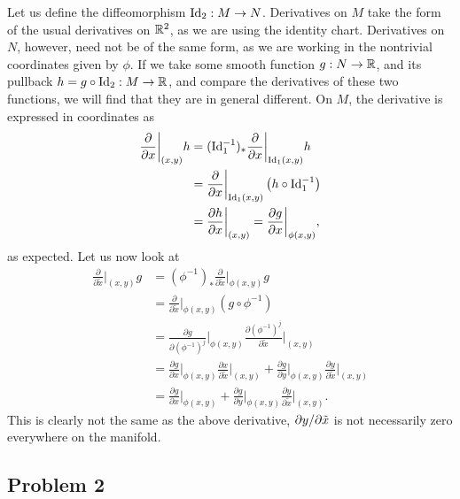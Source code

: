\documentclass{../../mathnotes}
\begin{document}
Let us define the diffeomorphism $\operatorname{Id}_2:M\to N$. Derivatives on $M$ take the form of the usual derivatives on
$\mathbb{R}^2$, as we are using the identity chart. Derivatives on $N$, however, need not be of the same form, as we
are working in the nontrivial coordinates given by $\phi$. If we take some smooth function $g:N\to\mathbb{R}$, and its
pullback $h=g\circ\operatorname{Id}_2:M\to\mathbb{R}$, and compare the derivatives of these two functions, we will find that they are
in general different. On $M$, the derivative is expressed in coordinates as
\begin{align*}
    \frac{\partial}{\partial x}\bigg|_{(x,y)}h&=(\operatorname{Id}_1^{-1})_*\frac{\partial}{\partial x}\bigg|_{\operatorname{Id}_1(x,y)}h\\
    &=\frac{\partial}{\partial x}\bigg|_{\operatorname{Id}_1(x,y)}\left( h\circ \operatorname{Id}_1^{-1} \right)\\
    &=\frac{\partial h}{\partial x}\bigg|_{(x,y)}=\frac{\partial g}{\partial x}\bigg|_{\phi(x,y)},
\end{align*}
as expected. Let us now look at
\begin{align*}
    \frac{\partial}{\partial \tilde x}\bigg|_{(x,y)}g&=(\phi^{-1})_*\frac{\partial}{\partial \tilde x}\bigg|_{\phi(x,y)}g\\
    &=\frac{\partial}{\partial \tilde x}\bigg|_{\phi(x,y)}(g\circ\phi^{-1})\\
    &=\frac{\partial g}{\partial (\phi^{-1})^j}\bigg|_{\phi(x,y)}\frac{\partial (\phi^{-1})^j}{\partial \tilde x}\bigg|_{(x,y)}\\
    &=\frac{\partial g}{\partial x}\bigg|_{\phi(x,y)}\frac{\partial x}{\partial \tilde x}\bigg|_{(x,y)}
    +\frac{\partial g}{\partial y}\bigg|_{\phi(x,y)}\frac{\partial y}{\partial \tilde x}\bigg|_{(x,y)}\\
    &=\frac{\partial g}{\partial x}\bigg|_{\phi(x,y)}
    +\frac{\partial g}{\partial y}\bigg|_{\phi(x,y)}\frac{\partial y}{\partial \tilde x}\bigg|_{(x,y)}.
\end{align*}
This is clearly not the same as the above derivative, $\partial y/\partial\tilde x$ is not necessarily zero everywhere on the manifold.

\subsection*{Problem 2}
\end{document}
